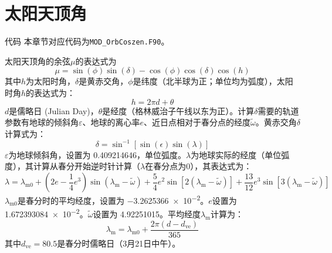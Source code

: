 \section{太阳天顶角}\label{太阳天顶角}
\begin{mymdframed}{代码}
  本章节对应代码为\texttt{MOD\_OrbCoszen.F90}。
\end{mymdframed}

太阳天顶角的余弦$\mu$的表达式为
\begin{equation}
  \mu= \sin(\phi)\sin(\delta)−\cos(\phi)\cos(\delta)\cos(h)
\end{equation}
%
其中$h$为太阳时角，$\delta$是黄赤交角，$\phi$是纬度（北半球为正；单位均为弧度），太阳时角$h$的表达式为：
\begin{equation}
  h=2\pi d+\theta
\end{equation}
$d$是儒略日 (Julian Day)，$\theta$是经度（格林威治子午线以东为正）。计算$\delta$需要的轨道参数有地球的倾斜角$\varepsilon$、地球的离心率$e$、近日点相对于春分点的经度$\widetilde{\omega}$。黄赤交角$\delta$计算式为：
\begin{equation}
  \delta= \sin^{−1}[\sin(\epsilon) \sin(\lambda)]
\end{equation}
%
$\varepsilon$为地球倾斜角，设置为 \num{0.409214646}，单位弧度。$\lambda$为地球实际的经度（单位弧度），其计算从春分开始逆时针计算（$\lambda$在春分点为0），其表达式为：
\begin{equation}
  \lambda = \lambda_{\mathrm{m0}} + \left( 2e - \frac{1}{4}{e}^{3} \right)\sin\left( \lambda_{\mathrm{m}} - \widetilde{\omega} \right) + \frac{5}{4}{e}^{2}\sin\left[2\left( \lambda_{\mathrm{m}} - \widetilde{\omega} \right)\right] + \frac{13}{12}{e}^{3}\sin\left[3\left( \lambda_{\mathrm{m}} - \widetilde{\omega} \right)\right]
\end{equation}
%
$\lambda_{\mathrm{m0}}$是春分时的平均经度，设置为 \num{-3.2625366e-2}。$e$设置为 \num{1.672393084e-2}。$\widetilde{\omega}$设置为 \num{4.92251015}。平均经度$\lambda_{\mathrm{m}}$计算为：
%
\begin{equation}
  \lambda_{\mathrm{m}} = \lambda_{\mathrm{m0}} + \frac{2\pi\left( d - d_{\mathrm{ve}} \right)}{365}
\end{equation}
%
其中\(d_{\mathrm{ve}} = 80.5\)是春分时儒略日（3月21日中午）。
